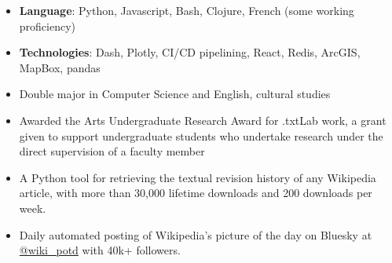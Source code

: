 \begin{itemize}
\item \textbf{Language}: Python, Javascript, Bash, Clojure, French (some working proficiency)
\item \textbf{Technologies}: Dash, Plotly, CI/CD pipelining, React, Redis, ArcGIS, MapBox, pandas
\end{itemize}

\begin{itemize}
\item Double major in Computer Science and English, cultural studies
\item Awarded the Arts Undergraduate Research Award for .txtLab work, a grant given to support undergraduate students who undertake research under the direct supervision of a faculty member
\end{itemize}

\begin{itemize}
\item A Python tool for retrieving the textual revision history of any Wikipedia article, with more than 30,000 lifetime downloads and 200 downloads per week.
\end{itemize}
\begin{itemize}
\item Daily automated posting of Wikipedia's picture of the day on Bluesky at \href{https://bsky.app/profile/wiki-potd.bsky.social}{@wiki\_potd} with 40k+ followers.
\end{itemize}

